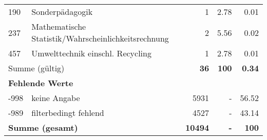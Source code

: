 \begin{longtable}{lXrrr}
        190 & \multicolumn{1}{X}{Sonderpädagogik} & %
          \num{1} &
          \num[round-mode=places,round-precision=2]{2.78} &
          \num[round-mode=places,round-precision=2]{0.01} \\

        237 & \multicolumn{1}{X}{Mathematische Statistik/Wahrscheinlichkeitsrechnung} & %
          \num{2} &
          \num[round-mode=places,round-precision=2]{5.56} &
          \num[round-mode=places,round-precision=2]{0.02} \\

        457 & \multicolumn{1}{X}{Umwelttechnik einschl. Recycling} & %
          \num{1} &
          \num[round-mode=places,round-precision=2]{2.78} &
          \num[round-mode=places,round-precision=2]{0.01} \\

     \midrule
     \multicolumn{2}{l}{Summe (gültig)} &
       \textbf{\num{36}} &
     \textbf{\num{100}} &
       \textbf{\num[round-mode=places,round-precision=2]{0.34}} \\
     \multicolumn{5}{l}{\textbf{Fehlende Werte}}\\
       -998 &
       keine Angabe &
         \num{5931} &
        - &
         \num[round-mode=places,round-precision=2]{56.52} \\
       -989 &
       filterbedingt fehlend &
         \num{4527} &
        - &
         \num[round-mode=places,round-precision=2]{43.14} \\
     \midrule
     \multicolumn{2}{l}{\textbf{Summe (gesamt)}} &
          \textbf{\num{10494}} &
        \textbf{-} &
        \textbf{\num{100}} \\
     \bottomrule
     \end{longtable}
     
